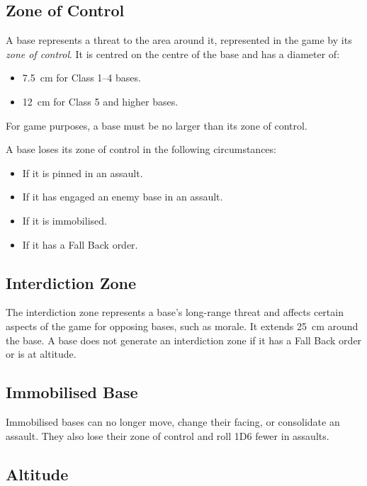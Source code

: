 \subsection{Zone of Control}

A base represents a threat to the area around it, represented in the game by its \textit{zone of control}. It is centred on the centre of the base and has a diameter of:

\begin{itemize}
    \item 7.5~cm for Class 1--4 bases.
    \item 12~cm for Class 5 and higher bases.
\end{itemize}

For game purposes, a base must be no larger than its zone of control.

A base loses its zone of control in the following circumstances:

\begin{itemize}
    \item If it is pinned in an assault.
    \item If it has engaged an enemy base in an assault.
    \item If it is immobilised.
    \item If it has a Fall Back order.
\end{itemize}

\subsection{Interdiction Zone}

The interdiction zone represents a base's long-range threat and affects certain aspects of the game for opposing bases, such as morale. It extends 25~cm around the base. A base does not generate an interdiction zone if it has a Fall Back order or is at altitude.

\subsection{Immobilised Base}

Immobilised bases can no longer move, change their facing, or consolidate an assault. They also lose their zone of control and roll 1D6 fewer in assaults.

\subsection{Altitude}

